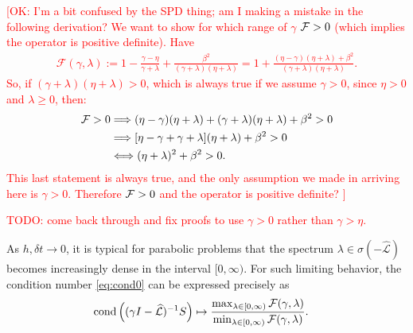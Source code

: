 \documentclass[a4paper,10pt]{article}
\newcommand{\tcr}{\textcolor{red}}
\begin{document}
\tcr{[OK: 
I'm a bit confused by the SPD thing; am I making a mistake in the following derivation? We want to show for which range of $\gamma$ ${\cal F} > 0$ (which implies the operator is positive definite). Have 
\begin{align*}
\mathcal{F}(\gamma,\lambda) := 
	1 - \frac{\gamma-\eta}{\gamma + \lambda} + \frac{\beta^2}{(\gamma + \lambda)(\eta+\lambda)} 
	=
1 + \frac{(\eta - \gamma) (\eta + \lambda) + \beta^2}{(\gamma + \lambda) (\eta + \lambda)}. 
\end{align*}
So, if $(\gamma + \lambda) (\eta + \lambda) > 0$, which is always true if we assume $\gamma > 0$, since $\eta > 0$ and $\lambda \geq 0$, then:
\begin{align*}
{\cal F} > 0 
&\Longrightarrow 
(\eta - \gamma) (\eta + \lambda) + (\gamma + \lambda) (\eta + \lambda) + \beta^2  > 0 \\
&\Longrightarrow 
[\eta - \gamma + \gamma + \lambda] (\eta + \lambda) + \beta^2  > 0 \\
& \Longleftrightarrow (\eta + \lambda)^2 + \beta^2 > 0.
\end{align*}
This last statement is always true, and the only assumption we made in arriving here is $\gamma > 0$. Therefore ${\cal F} > 0$ and the operator is positive definite?
]}

\tcr{TODO: come back through and fix proofs to use $\gamma > 0$  rather than $\gamma > \eta$.}

%
As $h,\delta t\to 0$, it is typical for parabolic problems that
the spectrum $\lambda\in\sigma\left(-\widehat{\mathcal{L}}\right)$
becomes increasingly dense in the interval $[0,\infty)$. For such limiting
behavior, the condition number \eqref{eq:cond0} can be expressed
precisely as
%
\begin{align}\label{eq:cond1}
\textnormal{cond}\left((\gamma I- \widehat{\mathcal{L}})^{-1}S\right) & \mapsto
	\frac{\max_{\lambda\in[0,\infty)} \mathcal{F}(\gamma,\lambda)}
		{\min_{\lambda\in[0,\infty)} \mathcal{F}(\gamma,\lambda)}.
\end{align}
%
\end{document}

